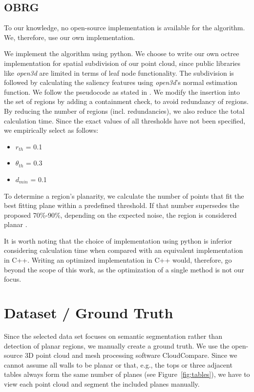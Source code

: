 \documentclass[main.tex]{subfiles}
\begin{document}
\subsection*{OBRG}
To our knowledge, no open-source implementation is available for the algorithm.
We, therefore, use our own implementation.

We implement the algorithm using python. We choose to write our own octree implementation for spatial subdivision of our point cloud, since
public libraries like \textit{open3d} are limited in terms of leaf node functionality.
The subdivision is followed by calculating the saliency features using \textit{open3d}'s normal estimation function.
We follow the pseudocode as stated in \cite[Algorithm~1]{Vo_Truong-Hong_Laefer_Bertolotto_2015}. We modify the insertion into the set
of regions by adding a containment check, to avoid redundancy of regions. By reducing the number of regions (incl. redundancies), we also
reduce the total calculation time.
Since the exact values of all thresholds have not been specified, we empirically select as follows:

\begin{itemize}
    \item $r_{th}$ = 0.1 
    \item $\theta_{th}$ = 0.3
    \item $d_{min}$ =  0.1
\end{itemize}

To determine a region's planarity, we calculate the number of points that fit the best fitting plane within a predefined threshold. 
If that number supersedes the proposed 70\%-90\%, depending on the expected noise, the region is considered planar \cite[Section~3.4]{Vo_Truong-Hong_Laefer_Bertolotto_2015}.

It is worth noting that the choice of implementation using python is inferior considering calculation time when compared with an equivalent implementation in C++. Writing an optimized implementation in C++ would, therefore, go beyond the scope of this work, as the optimization of
a single method is not our focus. 

\section{Dataset / Ground Truth}

Since the selected data set focuses on semantic segmentation rather than detection of planar regions, we manually create a ground truth.
We use the open-source 3D point cloud and mesh processing software CloudCompare.
Since we cannot assume all walls to be planar or that, e.g., the tops or three adjacent tables always form the same number of planes (see Figure~\ref{fig:tables}), we 
have to view each point cloud and segment the included planes manually.
\end{document}
